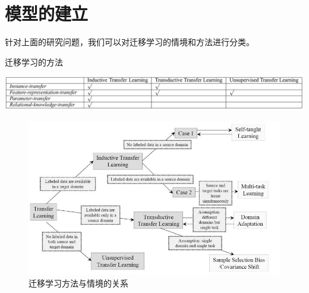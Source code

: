 \documentclass[10pt,journal,compsoc]{IEEEtran}
\begin{document}
\section{模型的建立}

针对上面的研究问题，我们可以对迁移学习的情境和方法进行分类。

\begin{table}[!ht]
\centering
\caption{迁移学习的方法}
\label{tab:survey_method}
\includegraphics[width=40pc]{img/survey_tab3.jpg}
\end{table}

\begin{figure}[!ht]
\centering
\includegraphics[width=30pc]{img/survey_fig1.jpg}
\caption{迁移学习方法与情境的关系}
\label{fig:survey_method}
\end{figure}
\end{document}
